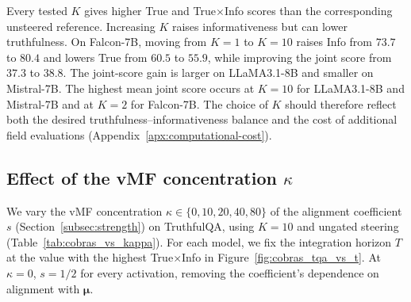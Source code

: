 
Every tested $K$ gives higher True and True$\times$Info scores than the corresponding unsteered reference. Increasing $K$ raises informativeness but can lower truthfulness. On Falcon-7B, moving from $K=1$ to $K=10$ raises Info from $73.7$ to $80.4$ and lowers True from $60.5$ to $55.9$, while improving the joint score from $37.3$ to $38.8$. The joint-score gain is larger on LLaMA3.1-8B and smaller on Mistral-7B. The highest mean joint score occurs at $K=10$ for LLaMA3.1-8B and Mistral-7B and at $K=2$ for Falcon-7B. The choice of $K$ should therefore reflect both the desired truthfulness--informativeness balance and the cost of additional field evaluations (Appendix~\ref{apx:computational-cost}).

\subsection{Effect of the vMF concentration $\kappa$}
\label{appendix:cobras_vs_kappa}

We vary the vMF concentration $\kappa\in\{0,10,20,40,80\}$ of the alignment coefficient $s$ (Section~\ref{subsec:strength}) on TruthfulQA, using $K=10$ and ungated steering (Table~\ref{tab:cobras_vs_kappa}). For each model, we fix the integration horizon $T$ at the value with the highest True$\times$Info in Figure~\ref{fig:cobras_tqa_vs_t}. At $\kappa=0$, $s=1/2$ for every activation, removing the coefficient's dependence on alignment with $\boldsymbol{\mu}$.

